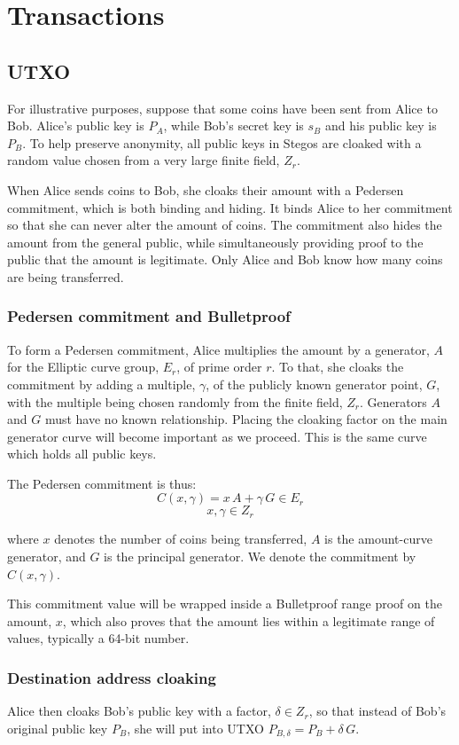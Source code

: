 \documentclass[8pt,fleqn,openany]{book}
\begin{document}
{		\chapter{Transactions}
		
		\section{UTXO}
		For illustrative purposes, suppose that some coins have been sent from Alice to Bob. Alice’s public key is $P_A$, while Bob’s secret key is $s_B$ and his public key is $P_B$. To help preserve anonymity, all public keys in Stegos are cloaked with a random value chosen from a very large finite field, $Z_r$.
		
		When Alice sends coins to Bob, she cloaks their amount with a Pedersen commitment, which is both binding and hiding. It binds Alice to her commitment so that she can never alter the amount of coins. The commitment also hides the amount from the general public, while simultaneously providing proof to the public that the amount is legitimate. Only Alice and Bob know how many coins are being transferred. 
		
		\subsection{Pedersen commitment and Bulletproof} To form a Pedersen commitment, Alice multiplies the amount by a generator, $A$ for the Elliptic curve group, $E_r$, of prime order $r$. To that, she cloaks the commitment by adding a multiple, $\gamma$, of the publicly known generator point, $G$, with the multiple being chosen randomly from the finite field, $Z_r$. Generators $A$ and $G$ must have no known relationship. Placing the cloaking factor on the main generator curve will become important as we proceed. This is the same curve which holds all public keys. 
		
		The Pedersen commitment is thus:
		$$ C(x, \gamma) = x \, A + \gamma \, G \in E_r$$
		$$x, \gamma \in Z_r$$
		
		where $x$ denotes the number of coins being transferred, $A$ is the amount-curve generator, and $G$ is the principal generator. We denote the commitment by $C(x, \gamma)$. 
		
		This commitment value will be wrapped inside a Bulletproof range proof on the amount, $x$, which also proves that the amount lies within a legitimate range of values, typically a 64-bit number.
		
		\subsection{Destination address cloaking} Alice then cloaks Bob’s public key with a factor, $\delta \in Z_r$, so that instead of Bob’s original public key $P_B$, she will put into UTXO $P_{B, \delta} = P_B + \delta \, G$.
		
}
\end{document}
